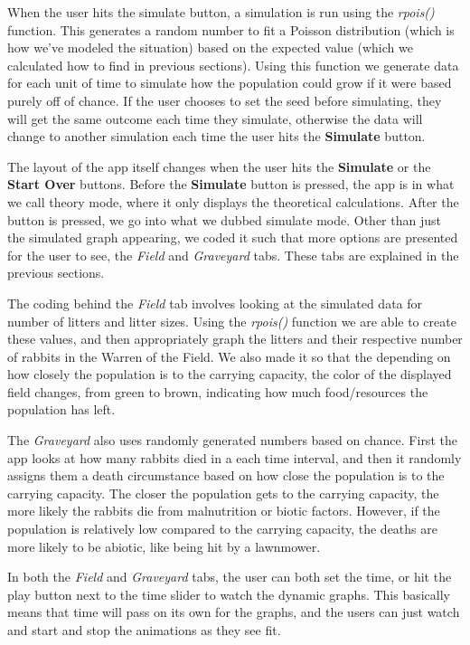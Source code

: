 \documentclass{article}\usepackage[]{graphicx}\usepackage[]{color}
\begin{document}
When the user hits the simulate button, a simulation is run using the \textit{rpois()} function. This generates a random number to fit a Poisson distribution (which is how we've modeled the situation) based on the expected value (which we calculated how to find in previous sections). Using this function we generate data for each unit of time to simulate how the population could grow if it were based purely off of chance. If the user chooses to set the seed before simulating, they will get the same outcome each time they simulate, otherwise the data will change to another simulation each time the user hits the \textbf{Simulate} button. 

The layout of the app itself changes when the user hits the \textbf{Simulate} or the \textbf{Start Over} buttons. Before the \textbf{Simulate} button is pressed, the app is in what we call theory mode, where it only displays the theoretical calculations. After the button is pressed, we go into what we dubbed simulate mode. Other than just the simulated graph appearing, we coded it such that more options are presented for the user to see, the \textit{Field} and \textit{Graveyard} tabs. These tabs are explained in the previous sections. 

The coding behind the \textit{Field} tab involves looking at the simulated data for number of litters and litter sizes. Using the \textit{rpois()} function we are able to create these values, and then appropriately graph the litters and their respective number of rabbits in the Warren of the Field. We also made it so that the depending on how closely the population is to the carrying capacity, the color of the displayed field changes, from green to brown, indicating how much food/resources the population has left. 

The \textit{Graveyard} also uses randomly generated numbers based on chance. First the app looks at how many rabbits died in a each time interval, and then it randomly assigns them a death circumstance based on how close the population is to the carrying capacity. The closer the population gets to the carrying capacity, the more likely the rabbits die from malnutrition or biotic factors. However, if the population is relatively low compared to the carrying capacity, the deaths are more likely to be abiotic, like being hit by a lawnmower. 

In both the \textit{Field} and \textit{Graveyard} tabs, the user can both set the time, or hit the play button next to the time slider to watch the dynamic graphs. This basically means that time will pass on its own for the graphs, and the users can just watch and start and stop the animations as they see fit. 
\end{document}
